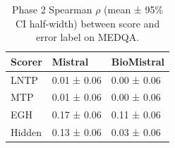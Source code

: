 \begin{table}
\caption{Phase 2 Spearman $\rho$ (mean ± 95\% CI half-width) between score and error label on MEDQA.}
\label{tab:phase2_spearman_medqa}
\begin{tabular}{lll}
\toprule
Scorer & Mistral & BioMistral \\
\midrule
LNTP & 0.01 ± 0.06 & 0.00 ± 0.06 \\
MTP & 0.01 ± 0.06 & 0.00 ± 0.06 \\
EGH & 0.17 ± 0.06 & 0.11 ± 0.06 \\
Hidden & 0.13 ± 0.06 & 0.03 ± 0.06 \\
\bottomrule
\end{tabular}
\end{table}
